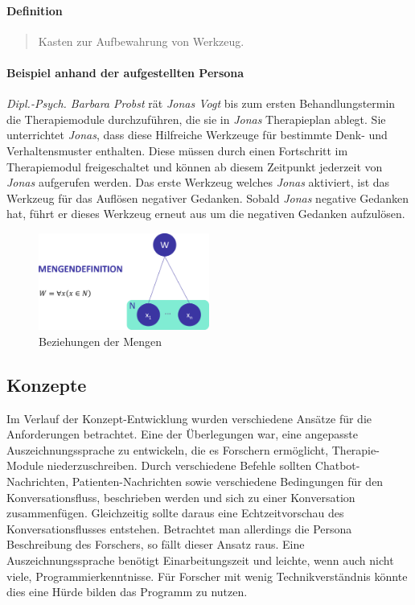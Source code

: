 \paragraph{Definition}
\begin{quote}
Kasten zur Aufbewahrung von Werkzeug. \cite{DudenWer23:online}
\end{quote}

\paragraph{Beispiel anhand der aufgestellten Persona}
\emph{Dipl.-Psych. Barbara Probst} rät \emph{Jonas Vogt} bis zum ersten Behandlungstermin die Therapiemodule durchzuführen, die sie in \emph{Jonas} Therapieplan ablegt. Sie unterrichtet \emph{Jonas}, dass diese Hilfreiche Werkzeuge für bestimmte Denk- und Verhaltensmuster enthalten. Diese müssen durch einen Fortschritt im Therapiemodul freigeschaltet und können ab diesem Zeitpunkt jederzeit von \emph{Jonas} aufgerufen werden. Das erste Werkzeug welches \emph{Jonas} aktiviert, ist das Werkzeug für das Auflösen negativer Gedanken. Sobald \emph{Jonas} negative Gedanken hat, führt er dieses Werkzeug erneut aus um die negativen Gedanken aufzulösen.

\begin{figure}[h]
\centering
\includegraphics[width=0.5\textwidth]{pictures/toolboxdef}
\caption{Beziehungen der Mengen}
\label{therapiedef}
\end{figure}



\subsection{Konzepte}
Im Verlauf der Konzept-Entwicklung wurden verschiedene Ansätze für die Anforderungen betrachtet. Eine der Überlegungen war, eine angepasste Auszeichnungssprache zu entwickeln, die es Forschern ermöglicht, Therapie-Module niederzuschreiben. Durch verschiedene Befehle sollten Chatbot-Nachrichten, Patienten-Nachrichten sowie verschiedene Bedingungen für den Konversationsfluss, beschrieben werden und sich zu einer Konversation zusammenfügen. Gleichzeitig sollte daraus eine Echtzeitvorschau des Konversationsflusses entstehen. Betrachtet man allerdings die Persona Beschreibung des Forschers, so fällt dieser Ansatz raus. Eine Auszeichnungssprache benötigt Einarbeitungszeit und leichte, wenn auch nicht viele, Programmierkenntnisse. Für Forscher mit wenig Technikverständnis könnte dies eine Hürde bilden das Programm zu nutzen. 

